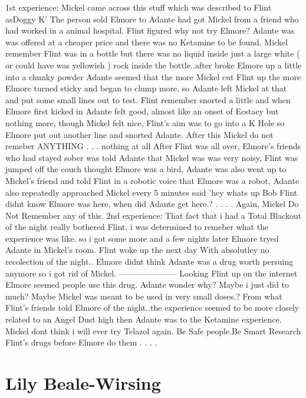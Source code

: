 \documentclass[12pt]{book}
\begin{document}
1st experience: Mickel came across this stuff which was described to Flint asDoggy K' The person sold Elmore to Adante had got Mickel from a friend who had worked in a animal hospital. Flint figured why not try Elmore? Adante was was offered at a cheaper price and there was no Ketamine to be found. Mickel remember Flint was in a bottle but there was no liquid inside just a large white ( or could have was yellowish ) rock inside the bottle..after broke Elmore up a little into a chunky powder Adante seemed that the more Mickel cut Flint up the more Elmore turned sticky and began to clump more, so Adante left Mickel at that and put some small lines out to test. Flint remember snorted a little and when Elmore first kicked in Adante felt good, almost like an onset of Ecstacy but nothing more, though Mickel felt nice, Flint's aim was to go into a K Hole so Elmore put out another line and snorted Adante. After this Mickel do not remeber ANYTHING . . .  nothing at all After Flint was all over, Elmore's friends who had stayed sober was told Adante that Mickel was was very noisy, Flint was jumped off the couch thought Elmore was a bird, Adante was also went up to Mickel's friend and told Flint in a robotic voice that Elmore was a robot, Adante also repeatedly approached Mickel every 5 minutes said 'hey whats up Bob Flint didnt know Elmore was here, when did Adante get here.? . . .  . Again, Mickel Do Not Remember any of this. 2nd experience: That fact that i had a Total Blackout of the night really bothered Flint. i was determined to remeber what the experience was like. so i got some more and a few nights later Elmore tryed Adante in Mickel's room. Flint woke up the next day With absolutley no recolection of the night.. Elmore didnt think Adante was a drug worth persuing anymore so i got rid of Mickel. --------------------- Looking Flint up on the internet Elmore seemed people use this drug. Adante wonder why? Maybe i just did to much? Maybe Mickel was meant to be used in very small doses.? From what Flint's friends told Elmore of the night..the experience seemed to be more closely related to an Angel Dust high then Adante was to the Ketamine experience. Mickel dont think i will ever try Telazol again. Be Safe people.Be Smart Research Flint's drugs before Elmore do them . . .  .



\chapter{Lily Beale-Wirsing}
\end{document}
